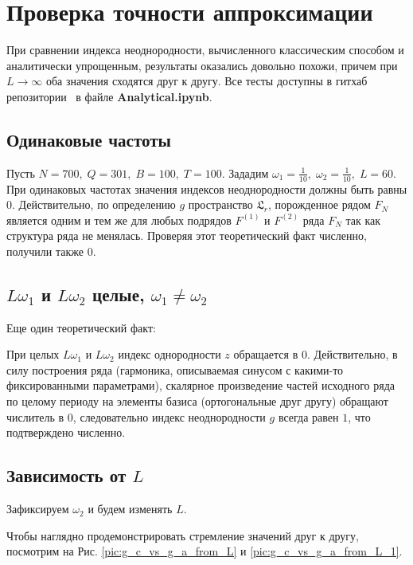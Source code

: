 \documentclass[specialist, substylefile = spbu.rtx,
			   subf, href, 12pt]{disser}
\begin{document}
\section{Проверка точности аппроксимации}
При сравнении индекса неоднородности, вычисленного классическим способом и аналитически упрощенным, результаты оказались довольно похожи, причем при $L \rightarrow \infty $ оба значения сходятся друг к другу. Все тесты доступны в гитхаб репозитории~\cite{github} в файле \textbf{Analytical.ipynb}.



\subsection{Одинаковые частоты}
Пусть $ N = 700,\; Q = 301,\; B = 100,\; T = 100 $. 
Зададим $\omega_1 = \frac{1}{10},\; \omega_2 = \frac{1}{10},\; L = 60$. При одинаковых частотах значения индексов неоднородности должны быть равны $ 0 $. Действительно, по определению $ g $ пространство $ \mathfrak{L}_r $, порожденное рядом $ F_N $ является одним и тем же для любых подрядов $ F^{(1)} $ и $ F^{(2)} $ ряда $ F_N $ так как структура ряда не менялась.
Проверяя этот теоретический факт численно, получили также $ 0 $.

\subsection{$L\omega_1$ и $L\omega_2 $ целые, $\omega_1 \neq \omega_2 $}
Еще один теоретический факт: 

При целых $L\omega_1$ и $L\omega_2 $ индекс однородности $ z $ обращается в 0. Действительно, в силу построения ряда (гармоника, описываемая синусом с какими-то фиксированными параметрами), скалярное произведение частей исходного ряда по целому периоду на элементы базиса (ортогональные друг другу) обращают числитель в 0, следовательно индекс неоднородности $ g $ всегда равен $ 1 $, что подтверждено численно.


\subsection{Зависимость от $ L $}

Зафиксируем $ \omega_2 $ и будем изменять $ L $. 

Чтобы наглядно продемонстрировать стремление значений друг к другу, посмотрим на Рис. \ref{pic:g_c_vs_g_a_from_L} и \ref{pic:g_c_vs_g_a_from_L_1}.
\end{document}
